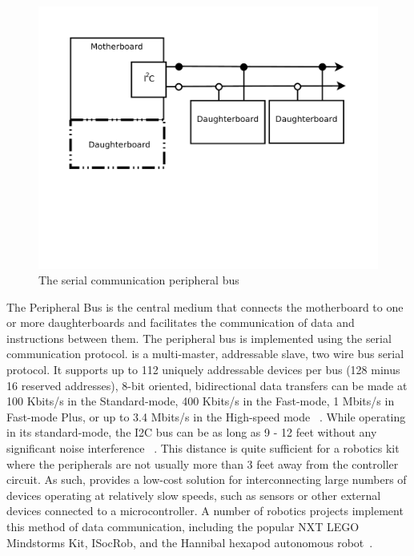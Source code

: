 	\begin{figure}[h]
	  \begin{center}
	    \includegraphics[width=1.0\columnwidth]{Figures/pbus.pdf}
	    \caption{The serial communication peripheral \iic bus}
	  \end{center}
	\end{figure}
	
	The Peripheral Bus is the central medium that connects the motherboard to one or more daughterboards and facilitates the communication of data and instructions between them. The peripheral bus is implemented using the \iic serial communication protocol. \iic is a multi-master, addressable slave, two wire bus serial protocol. It supports up to 112 uniquely addressable devices per bus (128 minus 16 reserved addresses), 8-bit oriented, bidirectional data transfers can be made at 100 Kbits/s in the Standard-mode, 400 Kbits/s in the Fast-mode, 1 Mbits/s in Fast-mode Plus, or up to 3.4 Mbits/s in the High-speed mode ~\parencite{edubots, i2cfaq}. While operating in its standard-mode, the I2C bus can be as long as 9 - 12 feet without any significant noise interference ~\parencite{Ferrell}. This distance is quite sufficient for a robotics kit where the peripherals are not usually more than 3 feet away from the controller circuit. As such, \iic provides a low-cost solution for interconnecting large numbers of devices operating at relatively slow speeds, such as sensors or other external devices connected to a microcontroller. A number of robotics projects implement this method of data communication, including the popular NXT LEGO Mindstorms Kit, ISocRob, and the Hannibal hexapod autonomous robot~\parencite{Ferrell, hannibal, Ventura}.
	
